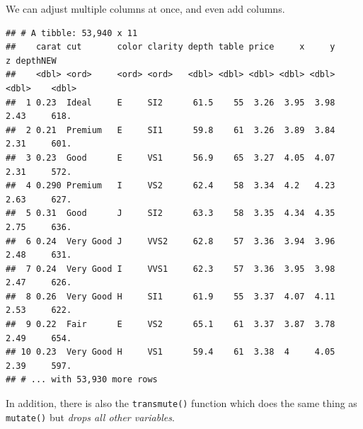 \documentclass[
]{book}
\newenvironment{Shaded}{\begin{snugshade}}{\end{snugshade}}
\newcommand{\DataTypeTok}[1]{\textcolor[rgb]{0.13,0.29,0.53}{#1}}
\newcommand{\DecValTok}[1]{\textcolor[rgb]{0.00,0.00,0.81}{#1}}
\newcommand{\KeywordTok}[1]{\textcolor[rgb]{0.13,0.29,0.53}{\textbf{#1}}}
\newcommand{\NormalTok}[1]{#1}
\newcommand{\OperatorTok}[1]{\textcolor[rgb]{0.81,0.36,0.00}{\textbf{#1}}}
\newcommand{\StringTok}[1]{\textcolor[rgb]{0.31,0.60,0.02}{#1}}
\begin{document}
We can adjust multiple columns at once, and even add columns.

\begin{Shaded}
\end{Shaded}

\begin{verbatim}
## # A tibble: 53,940 x 11
##    carat cut       color clarity depth table price     x     y     z depthNEW
##    <dbl> <ord>     <ord> <ord>   <dbl> <dbl> <dbl> <dbl> <dbl> <dbl>    <dbl>
##  1 0.23  Ideal     E     SI2      61.5    55  3.26  3.95  3.98  2.43     618.
##  2 0.21  Premium   E     SI1      59.8    61  3.26  3.89  3.84  2.31     601.
##  3 0.23  Good      E     VS1      56.9    65  3.27  4.05  4.07  2.31     572.
##  4 0.290 Premium   I     VS2      62.4    58  3.34  4.2   4.23  2.63     627.
##  5 0.31  Good      J     SI2      63.3    58  3.35  4.34  4.35  2.75     636.
##  6 0.24  Very Good J     VVS2     62.8    57  3.36  3.94  3.96  2.48     631.
##  7 0.24  Very Good I     VVS1     62.3    57  3.36  3.95  3.98  2.47     626.
##  8 0.26  Very Good H     SI1      61.9    55  3.37  4.07  4.11  2.53     622.
##  9 0.22  Fair      E     VS2      65.1    61  3.37  3.87  3.78  2.49     654.
## 10 0.23  Very Good H     VS1      59.4    61  3.38  4     4.05  2.39     597.
## # ... with 53,930 more rows
\end{verbatim}

In addition, there is also the \texttt{transmute()} function which does the same thing as \texttt{mutate()} but \emph{drops all other variables}.

\begin{Shaded}
\end{Shaded}
\end{document}
